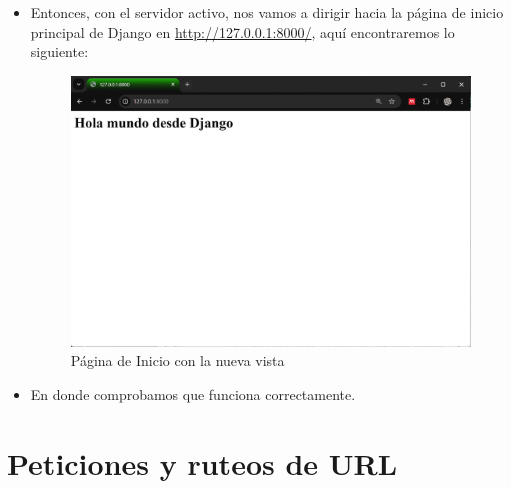 \documentclass{article}
\begin{document}
\begin{itemize}
            \item Entonces, con el servidor activo, nos vamos a dirigir hacia la página de inicio principal de Django en \url{http://127.0.0.1:8000/}, aquí  encontraremos lo siguiente:
        
        \begin{figure}[H]
            \centering
            \includegraphics[width=1\linewidth]{img/Inicio.png}
            \caption{Página de Inicio con la nueva vista}
            \label{fig:enter-label}
        \end{figure}
            \item En donde comprobamos que funciona correctamente.
        \end{itemize}

    
    \section{Peticiones y ruteos de URL}
\end{document}
